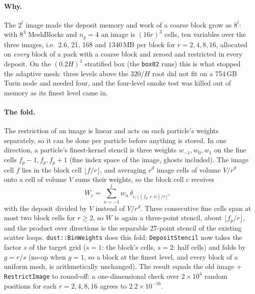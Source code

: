 \documentclass[11pt]{article}
\newcommand{\code}[1]{\texttt{#1}}
\newcommand{\fn}[1]{\texttt{\small #1}}
\begin{document}
\paragraph{Why.} The $2^l$ image made the deposit memory and work of a coarse block grow
as $8^l$: with $8^3$ MeshBlocks and $n_g = 4$ an image is $(16r)^3$ cells, ten variables
over the three images, i.e.\ 2.6, 21, 168 and 1340\,MB per block for $r = 2, 4, 8, 16$,
allocated on \emph{every} block of a pack with a coarse block and zeroed and restricted
in every deposit. On the $(0.2H)^3$ stratified box (the \code{box02} runs) this is what
stopped the adaptive mesh: three levels above the $320/H$ root did not fit on a 754\,GB
Turin node and needed four, and the four-level smoke test was killed out of memory as
its finest level came in.

\paragraph{The fold.} The restriction of an image is linear and acts on each particle's
weights separately, so it can be done per particle before anything is stored. In one
direction, a particle's finest-kernel stencil is three weights $w_{-1}, w_0, w_1$ on the
fine cells $f_p - 1, f_p, f_p + 1$ (fine index space of the image, ghosts included). The
image cell $f$ lies in the block cell $\lfloor f/r \rfloor$, and averaging $r^d$ image
cells of volume $V/r^d$ onto a cell of volume $V$ sums their weights, so the block cell $c$
receives
\begin{equation}
  W_c = \sum_{n=-1}^{1} w_n\,\delta_{c,\lfloor (f_p+n)/r \rfloor},
\end{equation}
with the deposit divided by $V$ instead of $V/r^d$. Three consecutive fine cells span at
most two block cells for $r \ge 2$, so $W$ is again a three-point stencil, about
$\lfloor f_p/r \rfloor$, and the product over directions is the separable 27-point stencil
of the existing scatter loops. \fn{dust::BinWeights} does this fold; \fn{DepositStencil}
now takes the factor $s$ of the target grid (\(s = 1\): the block's cells,
\(s = 2\): half cells) and folds by $g = r/s$ (no-op when $g = 1$, so a block at the finest
level, and every block of a uniform mesh, is arithmetically unchanged). The result equals
the old image + \fn{RestrictImage} to round-off: a one-dimensional check over $2\times10^4$
random positions for each $r = 2, 4, 8, 16$ agrees to $2.2\times10^{-16}$.
\end{document}
